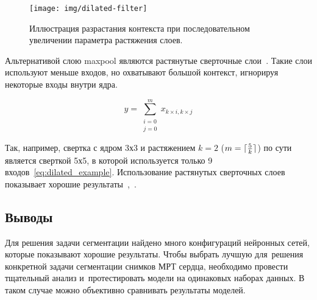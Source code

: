 \begin{figure}[hb]
  \texttt{[image: img/dilated-filter]}
  \caption{Иллюстрация разрастания контекста при последовательном увеличении параметра растяжения слоев.}
\end{figure}

Альтернативой слою maxpool являются растянутые сверточные слои~\cite{dilated_conv}. Такие слои используют меньше входов, но охватывают большой контекст, игнорируя некоторые входы внутри ядра. 

\begin{equation}
\label{eq:dilated_example}
y = \sum_{
  \substack{
    i=0 \\
    j=0
  }
}^{m}x_{k\times{}i,k\times{}j}
\end{equation}

\DeclarePairedDelimiter\ceil{\lceil}{\rceil}
\DeclarePairedDelimiter\floor{\lfloor}{\rfloor}

Так, например, свертка с ядром 3х3 и растяжением $k=2$ ($m=\ceil{\frac{5}{k}}$) по сути является сверткой 5х5, в которой используется только 9 входов~\eqref{eq:dilated_example}. Использование растянутых сверточных слоев показывает хорошие результаты~\cite{segm_dcnn_crf},~\cite{deeplab}.

\subsection{Выводы}

Для решения задачи сегментации найдено много конфигураций нейронных сетей, которые показывают хорошие результаты. Чтобы выбрать лучшую для~решения конкретной задачи сегментации снимков МРТ сердца, необходимо провести тщательный анализ и~протестировать модели на одинаковых наборах данных. В таком случае можно объективно сравнивать результаты моделей.
